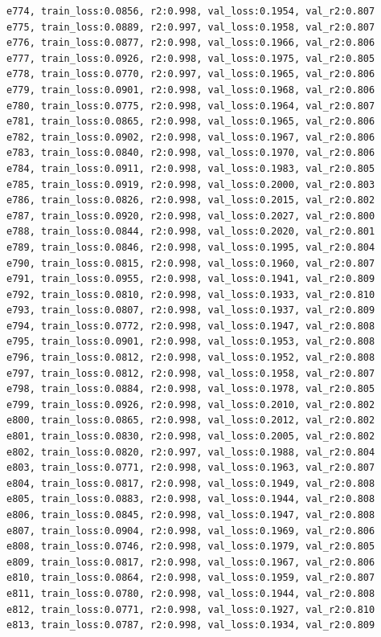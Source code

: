 \documentclass[a4paper, 12pt]{article}
\begin{document}
\begin{lstlisting}
e774, train_loss:0.0856, r2:0.998, val_loss:0.1954, val_r2:0.807
e775, train_loss:0.0889, r2:0.997, val_loss:0.1958, val_r2:0.807
e776, train_loss:0.0877, r2:0.998, val_loss:0.1966, val_r2:0.806
e777, train_loss:0.0926, r2:0.998, val_loss:0.1975, val_r2:0.805
e778, train_loss:0.0770, r2:0.997, val_loss:0.1965, val_r2:0.806
e779, train_loss:0.0901, r2:0.998, val_loss:0.1968, val_r2:0.806
e780, train_loss:0.0775, r2:0.998, val_loss:0.1964, val_r2:0.807
e781, train_loss:0.0865, r2:0.998, val_loss:0.1965, val_r2:0.806
e782, train_loss:0.0902, r2:0.998, val_loss:0.1967, val_r2:0.806
e783, train_loss:0.0840, r2:0.998, val_loss:0.1970, val_r2:0.806
e784, train_loss:0.0911, r2:0.998, val_loss:0.1983, val_r2:0.805
e785, train_loss:0.0919, r2:0.998, val_loss:0.2000, val_r2:0.803
e786, train_loss:0.0826, r2:0.998, val_loss:0.2015, val_r2:0.802
e787, train_loss:0.0920, r2:0.998, val_loss:0.2027, val_r2:0.800
e788, train_loss:0.0844, r2:0.998, val_loss:0.2020, val_r2:0.801
e789, train_loss:0.0846, r2:0.998, val_loss:0.1995, val_r2:0.804
e790, train_loss:0.0815, r2:0.998, val_loss:0.1960, val_r2:0.807
e791, train_loss:0.0955, r2:0.998, val_loss:0.1941, val_r2:0.809
e792, train_loss:0.0810, r2:0.998, val_loss:0.1933, val_r2:0.810
e793, train_loss:0.0807, r2:0.998, val_loss:0.1937, val_r2:0.809
e794, train_loss:0.0772, r2:0.998, val_loss:0.1947, val_r2:0.808
e795, train_loss:0.0901, r2:0.998, val_loss:0.1953, val_r2:0.808
e796, train_loss:0.0812, r2:0.998, val_loss:0.1952, val_r2:0.808
e797, train_loss:0.0812, r2:0.998, val_loss:0.1958, val_r2:0.807
e798, train_loss:0.0884, r2:0.998, val_loss:0.1978, val_r2:0.805
e799, train_loss:0.0926, r2:0.998, val_loss:0.2010, val_r2:0.802
e800, train_loss:0.0865, r2:0.998, val_loss:0.2012, val_r2:0.802
e801, train_loss:0.0830, r2:0.998, val_loss:0.2005, val_r2:0.802
e802, train_loss:0.0820, r2:0.997, val_loss:0.1988, val_r2:0.804
e803, train_loss:0.0771, r2:0.998, val_loss:0.1963, val_r2:0.807
e804, train_loss:0.0817, r2:0.998, val_loss:0.1949, val_r2:0.808
e805, train_loss:0.0883, r2:0.998, val_loss:0.1944, val_r2:0.808
e806, train_loss:0.0845, r2:0.998, val_loss:0.1947, val_r2:0.808
e807, train_loss:0.0904, r2:0.998, val_loss:0.1969, val_r2:0.806
e808, train_loss:0.0746, r2:0.998, val_loss:0.1979, val_r2:0.805
e809, train_loss:0.0817, r2:0.998, val_loss:0.1967, val_r2:0.806
e810, train_loss:0.0864, r2:0.998, val_loss:0.1959, val_r2:0.807
e811, train_loss:0.0780, r2:0.998, val_loss:0.1944, val_r2:0.808
e812, train_loss:0.0771, r2:0.998, val_loss:0.1927, val_r2:0.810
e813, train_loss:0.0787, r2:0.998, val_loss:0.1934, val_r2:0.809

\end{lstlisting}
\end{document}

